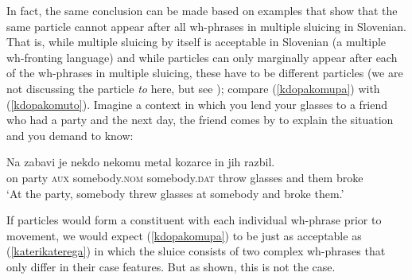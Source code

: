 \documentclass[output=paper,
modfonts,
newtxmath,
hidelinks
]{langscibook}
\begin{document}
\noindent In fact, the same conclusion can be made based on examples that show that the same particle cannot appear after all wh-phrases in multiple sluicing in Slovenian. That is, while multiple sluicing by itself is acceptable in Slovenian (a multiple wh-fronting language) and while particles can only marginally appear after each of the wh-phrases in multiple sluicing, these have to be different particles (we are not discussing the particle \textit{to} here, but see \citealt{marusicetal2015}); compare (\ref{kdopakomupa}) with (\ref{kdopakomuto}). Imagine a context in which you lend your glasses to a friend who had a party and the next day, the friend comes by to explain the situation and you demand to know:  

\begin{exe}
\ex \gll 
Na zabavi je nekdo nekomu metal kozarce in jih razbil. \\
on party \textsc{aux} somebody.\textsc{nom} somebody.\textsc{dat} throw glasses and them broke\\
\trans `At the party, somebody threw glasses at somebody and broke them.'

\ex \label{kdokomuvsi}\begin{xlist}
\label{kdokomu}
 \label{kdopakomupa}
\label{kdokomupa}
\label{kdopakomu}
\label{kdopakomuto}
\end{xlist}\end{exe}

\noindent If particles would form a constituent with each individual wh-phrase prior to movement, we would expect (\ref{kdopakomupa}) to be just as acceptable as (\ref{katerikaterega}) in which the sluice consists of two complex wh-phrases that only differ in their case features. But as shown, this is not the case. 
\end{document}

